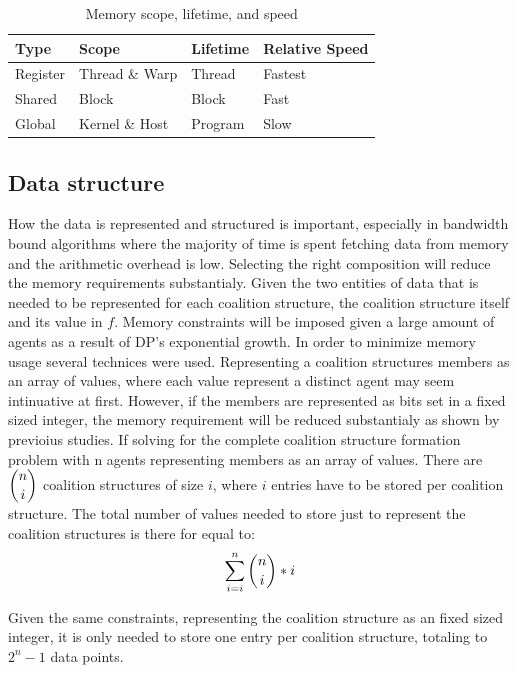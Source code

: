 \documentclass{llncs}
\begin{document}
\begin{table}
\centering
\caption{Memory scope, lifetime, and speed \label{mem}}
\begin{tabular}{|l|l|l|l|} \hline
Type&Scope&Lifetime&Relative Speed \\ \hline
Register&Thread \& Warp&Thread&Fastest\\
Shared&Block&Block&Fast\\
Global&Kernel \& Host&Program&Slow\\
\hline\end{tabular}
\end{table}

\subsection{Data structure} %
How the data is represented and structured is important, 
especially in bandwidth bound algorithms where the majority of time
is spent fetching data from memory and the arithmetic overhead is low.
Selecting the right composition will reduce the memory requirements substantialy.
Given the two entities of data that is needed to be represented for each coalition structure, 
the coalition structure itself and its value in $f$. 
Memory constraints will be imposed given a large amount of agents as a result of DP's exponential growth. 
In order to minimize memory usage several technices were used. 
Representing a coalition structures members as an array of values,
where each value represent a distinct agent may seem intinuative at first. 
However, if the members are represented as bits set in a fixed sized integer, the memory
requirement will be reduced substantialy as shown by previoius studies.\cite{boyer2012solving}
If solving for the complete coalition structure formation problem with n agents representing members as an array of values.
There are \begin{math}\dbinom{n}{i}\end{math} coalition structures of size $i$, where
$i$ entries have to be stored per coalition structure.
The total number of values needed to store just to represent the coalition structures is there for equal to:
\begin{displaymath}\sum_{i=i}^{n} \dbinom{n}{i}*i\end{displaymath}

Given the same constraints, representing the coalition structure as an fixed sized integer, it is only 
needed to store one entry per coalition structure, totaling to \begin{math}2^n-1\end{math} data points.
\end{document}
